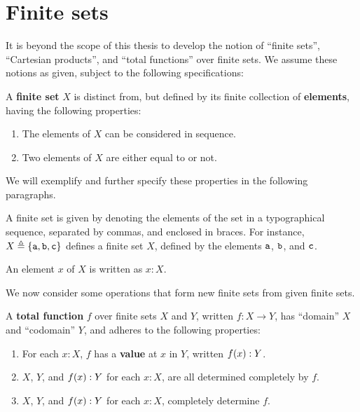 \section{Finite sets}

It is beyond the scope of this thesis to develop the notion of ``finite sets'',
``Cartesian products'', and ``total functions'' over finite sets. We assume
these notions as given, subject to the following specifications:

\begin{specification}

A \textbf{finite set} $X$ is distinct from, but defined by its finite
collection of \textbf{elements}, having the following properties:

\begin{enumerate}

\item The elements of $X$ can be considered in sequence.

\item Two elements of $X$ are either equal to or not.

\end{enumerate}

\end{specification}

We will exemplify and further specify these properties in the following
paragraphs.

\begin{notation} A finite set is given by denoting the elements of the set in a
typographical sequence, separated by commas, and enclosed in braces. For
instance, $X\triangleq\mathopen{}\left\{{\mathtt{a},\mathtt{b},\mathtt{c}}\right\}\mathclose{}$ defines a finite set
$X$, defined by the elements $\mathtt{a}$, $\mathtt{b}$, and
$\mathtt{c}$.\end{notation}

\begin{notation} An element $x$ of $X$ is written as $x:X$. \end{notation}

We now consider some operations that form new finite sets from given finite sets.

\begin{specification} A \textbf{total function} $f$ over finite sets $X$ and
$Y$, written  $f:X\rightarrow Y$, has ``domain'' $X$ and ``codomain'' $Y$,
and adheres to the following properties:

\begin{enumerate}

\item For each $x:X$, $f$ has a \textbf{value} at $x$ in $Y$, written $f\mathopen{}\left({x}\right)\mathclose{}:Y$.

\item $X$, $Y$, and $f\mathopen{}\left({x}\right)\mathclose{} : Y$ for each $x : X$, are all determined completely
by $f$.

\item $X$, $Y$, and $f\mathopen{}\left({x}\right)\mathclose{} : Y$ for each $x : X$, completely determine $f$.

\end{enumerate}

\end{specification}

